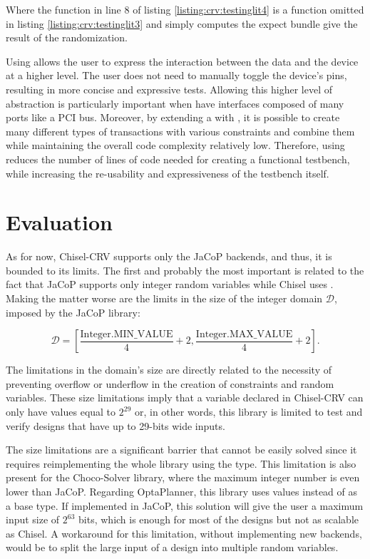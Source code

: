 Where the  function in line 8 of listing
\ref{listing:crv:testinglit4} is a function omitted in listing
\ref{listing:crv:testinglit3} and simply computes the expect 
bundle give the result of the randomization.

Using  allows the user to express the interaction between the
data and the device at a higher level. The user does not need to manually toggle
the device's pins, resulting in more concise and expressive tests. Allowing this
higher level of abstraction is particularly important when  have
interfaces composed of many ports like a PCI bus. Moreover, by extending a
 with , it is possible to create many different
types of transactions with various constraints and combine them while
maintaining the overall code complexity relatively low. Therefore, using
 reduces the number of lines of code needed for creating a
functional testbench, while increasing the re-usability and expressiveness of
the testbench itself.

\section{Evaluation} \label{sec:evaluation}
As for now, Chisel-CRV supports only the JaCoP backends, and thus, it is bounded
to its limits. The first and probably the most important is related to the fact
that JaCoP supports only integer random variables while Chisel uses
. Making the matter worse are the limits in the size of the
integer domain $\mathcal{D}$, imposed by the JaCoP library:

\begin{equation}
    \mathcal{D} = \left[\frac{\text{Integer.MIN\_VALUE}}{4} + 2, \frac{\text{Integer.MAX\_VALUE}}{4} + 2\right].
\end{equation}

The limitations in the domain's size are directly related to the necessity of
preventing overflow or underflow in the creation of constraints and random
variables. These size limitations imply that a  variable declared in
Chisel-CRV can only have values equal to $2^{29}$ or, in other words, this
library is limited to test and verify designs that have up to 29-bits wide
inputs.

The size limitations are a significant barrier that cannot be easily solved
since it requires reimplementing the whole library using the 
type. This limitation is also present for the Choco-Solver library, where the
maximum integer number is even lower than JaCoP. Regarding OptaPlanner, this
library uses  values instead of  as a base type. If
implemented in JaCoP, this solution will give the user a maximum input size of
$2^{63}$ bits, which is enough for most of the designs but not as scalable as
Chisel. A workaround for this limitation, without implementing new backends,
would be to split the large input of a design into multiple random variables.

